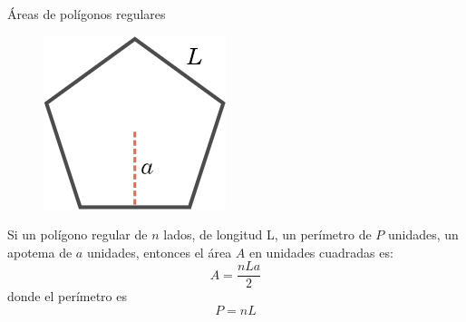 \begin{infocard}{Áreas de polígonos regulares}
    \begin{figure}
        \centering
        \includegraphics[width=\linewidth]{../images/apotema.png}
    \end{figure}
    Si un polígono regular de $n$ lados, de longitud L, un perímetro de $P$ unidades, un apotema de $a$ unidades, entonces el área $A$ en unidades cuadradas es:
        \[A=\dfrac{nLa}{2}\]
        donde el perímetro es 
        \[P=nL\]
\end{infocard}
